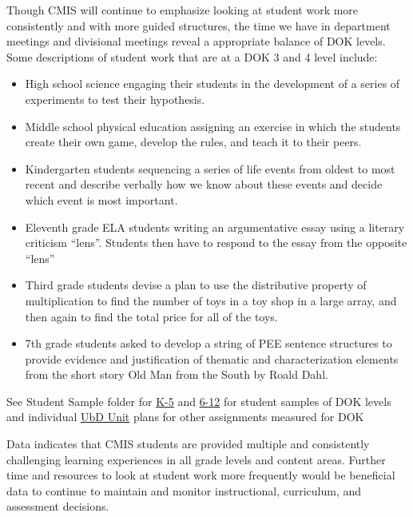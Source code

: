 \begin{findings}
Though CMIS will  continue to emphasize looking at student work more consistently and with more guided structures, the time we have in department meetings and divisional meetings reveal a appropriate balance of DOK levels. Some descriptions of student work that are at a DOK 3 and 4 level include: 
\begin{itemize}
\item High school science engaging their students in the development of a series of experiments to test their hypothesis.
\item Middle school physical education assigning an exercise in which the students create their own game, develop the rules, and teach it to their peers. 
\item Kindergarten students sequencing a series of life events from oldest to most recent and describe verbally how we know about these events and decide which event is most important. 
\item Eleventh grade ELA students writing an argumentative essay using a literary criticism “lens”. Students then have to respond to the essay from the opposite “lens” 
\item Third grade students devise a plan to use the distributive property of multiplication to find the number of toys in a toy shop in a large array, and then again to find the total price for all of the toys.
\item 7th grade students asked to develop a string of PEE sentence structures to provide evidence and justification of thematic and characterization elements from the short story Old Man from the South by Roald Dahl. 
\end{itemize}

See Student Sample folder for \href{https://drive.google.com/drive/folders/0ByVFfrm0zfolVGJzdXpvLV9reVk?usp=sharing}{K-5} and  \href{https://drive.google.com/drive/folders/0ByVFfrm0zfolMkF5aThoSzZxa1E?usp=sharing}{6-12} for student samples of DOK levels and individual \href{https://docs.google.com/a/cmis.ac.th/document/d/1kL1VjwfuMMa7NaWmwUrEah1BM-jJRmLAd4VJzR3HoPs/edit?usp=sharing}{UbD Unit} plans for other assignments measured for DOK 


Data indicates that CMIS students are provided multiple and consistently challenging learning experiences in all grade levels and content areas. Further time and resources to look at student work more frequently would be beneficial data to continue to maintain and monitor instructional, curriculum, and assessment decisions.  
\end{findings}

